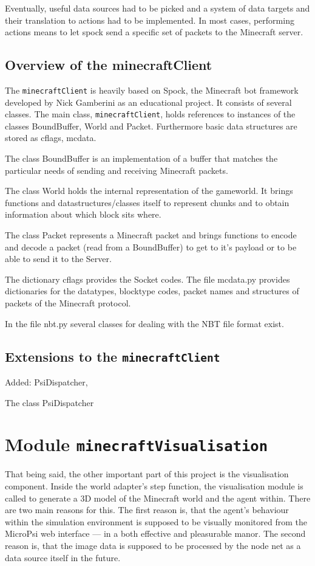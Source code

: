 Eventually, useful data sources had to be picked and a system of data targets and their translation to actions had to be implemented. In most cases, performing actions means to let spock send a specific set of packets to the Minecraft server.

        \subsection{Overview of the minecraftClient}
The \texttt{minecraftClient} is heavily based on Spock, the Minecraft bot framework developed by Nick Gamberini as an educational project. It consists of several classes. The main class, \texttt{minecraftClient}, holds references to instances of the classes BoundBuffer,  World and Packet. Furthermore basic data structures are stored as cflags, mcdata.

The class BoundBuffer is an implementation of a buffer that matches the particular needs of sending and receiving Minecraft packets.

The class World holds the internal representation of the gameworld. It brings functions and datastructures/classes itself to represent chunks and to obtain information about which block sits where.

The class Packet represents a Minecraft packet and brings functions to encode and decode a packet (read from a BoundBuffer) to get to it's payload or to be able to send it to the Server.

The dictionary cflags provides the Socket codes.
The file mcdata.py provides dictionaries for the datatypes, blocktype codes, packet names and structures of packets of the Minecraft protocol.

In the file nbt.py several classes for dealing with the NBT file format exist.

        \subsection{Extensions to the \texttt{minecraftClient}}
Added: PsiDispatcher,
        
The class PsiDispatcher

    \section{Module \texttt{minecraftVisualisation}}
That being said, the other important part of this project is the visualisation component. Inside the world adapter's step function, the visualisation module is called to generate a 3D model of the Minecraft world and the agent within. There are two main reasons for this. The first reason is, that the agent's behaviour within the simulation environment is supposed to be visually monitored from the MicroPsi web interface --- in a both effective and pleasurable manor. The second reason is, that the image data is supposed to be processed by the node net as a data source itself in the future.

